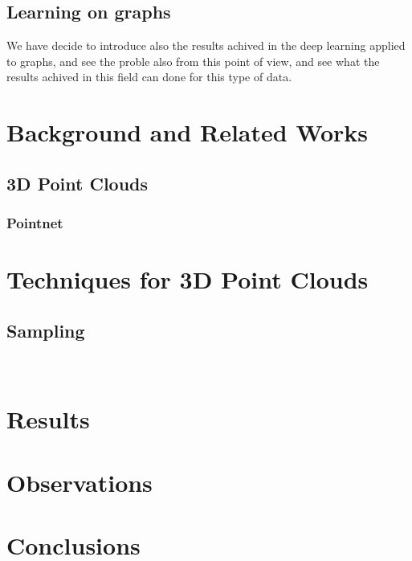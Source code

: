 \documentclass[12pt]{article}
\begin{document}
\subsection{Learning on graphs}
We have decide to introduce also the results achived in the deep learning applied to graphs, 
and see the proble also from this point of view, and see what the results achived in this field can done for this type of data.


\section{Background and Related Works}

\subsection{3D Point Clouds}

\subsubsection{Pointnet}




\section{Techniques for 3D Point Clouds}

\subsection{Sampling}

\

\section{Results}


\section{Observations}


\section{Conclusions}

\appendix



\end{document}
